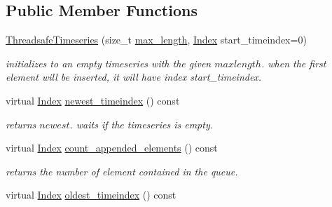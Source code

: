 \subsection*{Public Member Functions}
\begin{DoxyCompactItemize}
\item 
\hyperlink{classreal__time__tools_1_1ThreadsafeTimeseries_a06769598feb483bda198edb9c88c8de4}{Threadsafe\+Timeseries} (size\+\_\+t \hyperlink{classreal__time__tools_1_1ThreadsafeTimeseries_a4d1fd7d17f1c896a81ea62923591dbc4}{max\+\_\+length}, \hyperlink{classreal__time__tools_1_1ThreadsafeTimeseries_a9364696c534468d7ad927883b16ca981}{Index} start\+\_\+timeindex=0)
\begin{DoxyCompactList}\small\item\em initializes to an empty timeseries with the given $ maxlength $. when the first element will be inserted, it will have index start\+\_\+timeindex. \end{DoxyCompactList}\item 
virtual \hyperlink{classreal__time__tools_1_1ThreadsafeTimeseries_a9364696c534468d7ad927883b16ca981}{Index} \hyperlink{classreal__time__tools_1_1ThreadsafeTimeseries_a6e453d4c31109908fc074dddf8cfa0f4}{newest\+\_\+timeindex} () const \hypertarget{classreal__time__tools_1_1ThreadsafeTimeseries_a6e453d4c31109908fc074dddf8cfa0f4}{}\label{classreal__time__tools_1_1ThreadsafeTimeseries_a6e453d4c31109908fc074dddf8cfa0f4}

\begin{DoxyCompactList}\small\item\em returns $ newest $. waits if the timeseries is empty. \end{DoxyCompactList}\item 
virtual \hyperlink{classreal__time__tools_1_1ThreadsafeTimeseries_a9364696c534468d7ad927883b16ca981}{Index} \hyperlink{classreal__time__tools_1_1ThreadsafeTimeseries_afcf05dc48b7cf190b7aeb11e0352cbd6}{count\+\_\+appended\+\_\+elements} () const \hypertarget{classreal__time__tools_1_1ThreadsafeTimeseries_afcf05dc48b7cf190b7aeb11e0352cbd6}{}\label{classreal__time__tools_1_1ThreadsafeTimeseries_afcf05dc48b7cf190b7aeb11e0352cbd6}

\begin{DoxyCompactList}\small\item\em returns the number of element contained in the queue. \end{DoxyCompactList}\item 
virtual \hyperlink{classreal__time__tools_1_1ThreadsafeTimeseries_a9364696c534468d7ad927883b16ca981}{Index} \hyperlink{classreal__time__tools_1_1ThreadsafeTimeseries_af3f4bbdf3f588f6936c8d1f5777dbf6e}{oldest\+\_\+timeindex} () const \hypertarget{classreal__time__tools_1_1ThreadsafeTimeseries_af3f4bbdf3f588f6936c8d1f5777dbf6e}{}\label{classreal__time__tools_1_1ThreadsafeTimeseries_af3f4bbdf3f588f6936c8d1f5777dbf6e}


\end{DoxyCompactItemize}
